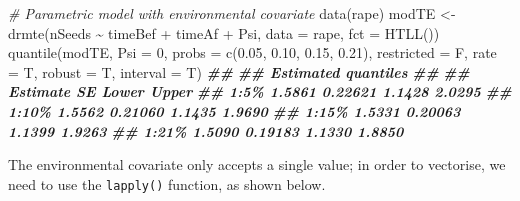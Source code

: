 \documentclass[
]{book}
\newenvironment{Shaded}{\begin{snugshade}}{\end{snugshade}}
\newcommand{\AttributeTok}[1]{\textcolor[rgb]{0.77,0.63,0.00}{#1}}
\newcommand{\CommentTok}[1]{\textcolor[rgb]{0.56,0.35,0.01}{\textit{#1}}}
\newcommand{\DecValTok}[1]{\textcolor[rgb]{0.00,0.00,0.81}{#1}}
\newcommand{\DocumentationTok}[1]{\textcolor[rgb]{0.56,0.35,0.01}{\textbf{\textit{#1}}}}
\newcommand{\FloatTok}[1]{\textcolor[rgb]{0.00,0.00,0.81}{#1}}
\newcommand{\FunctionTok}[1]{\textcolor[rgb]{0.00,0.00,0.00}{#1}}
\newcommand{\NormalTok}[1]{#1}
\newcommand{\OtherTok}[1]{\textcolor[rgb]{0.56,0.35,0.01}{#1}}
\newcommand{\SpecialCharTok}[1]{\textcolor[rgb]{0.00,0.00,0.00}{#1}}
\begin{document}
\begin{Shaded}
\begin{Highlighting}[]
\CommentTok{\# Parametric model with environmental covariate}
\FunctionTok{data}\NormalTok{(rape)}
\NormalTok{modTE }\OtherTok{\textless{}{-}} \FunctionTok{drmte}\NormalTok{(nSeeds }\SpecialCharTok{\textasciitilde{}}\NormalTok{ timeBef }\SpecialCharTok{+}\NormalTok{ timeAf }\SpecialCharTok{+}\NormalTok{ Psi,}
            \AttributeTok{data =}\NormalTok{ rape, }\AttributeTok{fct =} \FunctionTok{HTLL}\NormalTok{())}
\FunctionTok{quantile}\NormalTok{(modTE, }\AttributeTok{Psi =} \DecValTok{0}\NormalTok{, }
         \AttributeTok{probs =} \FunctionTok{c}\NormalTok{(}\FloatTok{0.05}\NormalTok{, }\FloatTok{0.10}\NormalTok{, }\FloatTok{0.15}\NormalTok{, }\FloatTok{0.21}\NormalTok{), }
         \AttributeTok{restricted =}\NormalTok{ F, }\AttributeTok{rate =}\NormalTok{ T, }\AttributeTok{robust =}\NormalTok{ T,}
         \AttributeTok{interval =}\NormalTok{ T)}
\DocumentationTok{\#\# }
\DocumentationTok{\#\# Estimated quantiles}
\DocumentationTok{\#\# }
\DocumentationTok{\#\#       Estimate      SE  Lower  Upper}
\DocumentationTok{\#\# 1:5\%    1.5861 0.22621 1.1428 2.0295}
\DocumentationTok{\#\# 1:10\%   1.5562 0.21060 1.1435 1.9690}
\DocumentationTok{\#\# 1:15\%   1.5331 0.20063 1.1399 1.9263}
\DocumentationTok{\#\# 1:21\%   1.5090 0.19183 1.1330 1.8850}
\end{Highlighting}
\end{Shaded}

The environmental covariate only accepts a single value; in order to vectorise, we need to use the \texttt{lapply()} function, as shown below.
\end{document}
